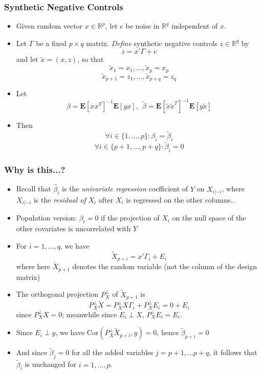 \documentclass{beamer}
\newcommand{\E}{\textbf{E}}
\begin{document}
\begin{frame}
\frametitle{Synthetic Negative Controls}
\begin{itemize}
\item<1-> Given random vector $x \in \mathbb{R}^p$, let $e$ be noise in $\mathbb{R}^q$ independent of $x$.
\item<1-> Let $\Gamma$ be a fixed $p \times q$ matrix. \emph{Define} synthetic negative controls $z \in \mathbb{R}^{q}$ by
\[
z = x'\Gamma + e
\]
and let $\tilde{x} = (x, z)$, so that 
\[
\tilde{x}_1 = x_1,\hdots, \tilde{x}_p = x_p
\]
\[
\tilde{x}_{p+1} = z_1,\hdots, \tilde{x}_{p+q} = z_q
\]
\item<2-> Let
\[
\beta = \E[xx^T]^{-1}\E[yx], \ \ \tilde{\beta} = \E[\tilde{x}\tilde{x}^T]^{-1} \E[y\tilde{x}]
\]
\item<3-> Then
\[
\forall i \in \{1, \hdots, p\}: \beta_i = \tilde{\beta}_i
\]
\[
\forall i \in \{p+1,\hdots, p+q\}: \tilde{\beta}_i = 0
\]
\end{itemize}
\end{frame}

\begin{frame}
\frametitle{Why is this...?}
\begin{itemize}
\item<1> Recall that $\hat{\beta}_i$ is the \emph{univariate regression} coefficient of $Y$
  on $X_{i|-i}$, where $X_{i|-i}$ is the \emph{residual of} $X_i$ after $X_i$ is regressed on the other columns..
\item<1-> Population version: $\beta_i = 0$ if the projection of $X_i$ on the null space of the other covariates is uncorrelated with $Y$
\item<2-3> For $i= 1, \hdots, q$, we have 
\[
\tilde{X}_{p+i} = x' \Gamma_i + E_i
\]
where here $\tilde{X}_{p+1}$ denotes the random variable (not the column of the design matrix)
\item<3-4> The orthogonal projection $P^\perp_X$ of $\tilde{X}_{p+1}$ is
\[
P^\perp_X \tilde{X} = P^\perp_X X \Gamma_i + P^\perp_X E_i = 0 + E_i
\]
since $P^\perp_X X = 0$; meanwhile since $E_i \perp X$, $P^\perp_X E_i = E_i$.
\item<4-5> Since $E_i \perp y$, we have $\text{Cor}(P^\perp_X \tilde{X}_{p+i} , y) = 0$, hence $\tilde{\beta}_{p+i} = 0$
\item<5-> And since $\tilde{\beta}_j = 0$ for all the added variables $j = p+1,\hdots p+q$, it follows that $\tilde{\beta}_i$ is unchanged for $i = 1,\hdots, p$.
\end{itemize}
\end{frame}
\end{document}
